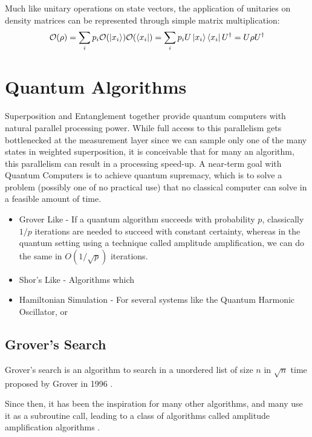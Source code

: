 Much like unitary operations on state vectors, the application of unitaries on density matrices can be represented through simple matrix multiplication:
\begin{equation}
    \mathcal{O} (\rho) = \sum_i p_i \mathcal{O}(\ket{x_i}) \mathcal{O}(\bra{x_i}) = \sum_i p_i U \ket{x_i} \bra{x_i} U^\dagger = U \rho U^\dagger
\end{equation}


\section{Quantum Algorithms}
\label{sec:quantum-algorithms}

Superposition and Entanglement together provide quantum computers with natural parallel processing power. While full access to this parallelism gets bottlenecked at the measurement layer since we can sample only one of the many states in weighted superposition, it is conceivable that for many an algorithm, this parallelism can result in a processing speed-up. A near-term goal with Quantum Computers is to achieve quantum supremacy, which is to solve a problem (possibly one of no practical use) that no classical computer can solve in a feasible amount of time. \cite{quantum-complexity-survey}

\begin{itemize}
    \item Grover Like - If a quantum algorithm succeeds with probability $p$, classically $1/p$ iterations are needed to succeed with constant certainty, whereas in the quantum setting using a technique called amplitude amplification, we can do the same in $O(1/\sqrt{p})$ iterations.
    \item Shor's Like - Algorithms which
    \item Hamiltonian Simulation - For several systems like the Quantum Harmonic Oscillator, or  
\end{itemize}


\subsection{Grover's Search}

Grover's search is an algorithm to search in a unordered list of size $n$ in $\sqrt{n}$ time proposed by Grover in 1996 \cite{grover-search-original}.

Since then, it has been the inspiration for many other algorithms, and many use it as a subroutine call, leading to a class of algorithms called amplitude amplification algorithms \cite{quantum-amplitude-amplification-algorithms}.

